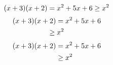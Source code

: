 \documentclass{article}
\begin{document}
\begin{equation}
	(x+3)(x+2)=x^2+5x+6\notag\\
	\geq x^2
\end{equation}
\begin{gather}
	(x+3)(x+2)=x^2+5x+6\notag\\
	\geq x^2
\end{gather}
\begin{align}
	(x+3)(x+2)&=x^2+5x+6\notag\\
	&\geq x^2
\end{align}
\end{document}
